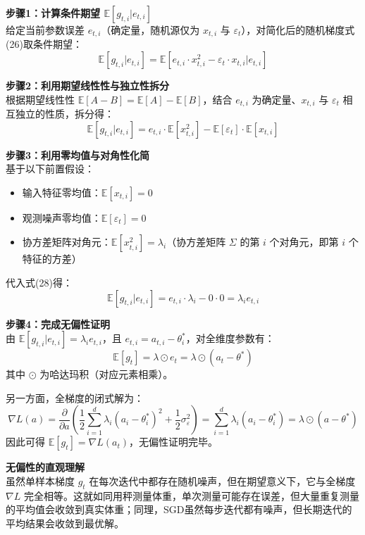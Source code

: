 \documentclass[10pt]{article}
\numberwithin{equation}{section}
\theoremstyle{plain}
\theoremstyle{definition}
\theoremstyle{remark}
\begin{document}
\begin{AnalysisBox}[完整证明过程]
\textbf{步骤1：计算条件期望 $\mathbb{E}[g_{t,i}|e_{t,i}]$}\\
给定当前参数误差 $e_{t,i}$（确定量，随机源仅为 $x_{t,i}$ 与 $\varepsilon_t$），对简化后的随机梯度式(26)取条件期望：
\[ \displaystyle \mathbb{E}[g_{t,i}|e_{t,i}] = \mathbb{E}\left[e_{t,i} \cdot x_{t,i}^2 - \varepsilon_t \cdot x_{t,i}\bigg|e_{t,i}\right] \tag{27} \]

\textbf{步骤2：利用期望线性性与独立性拆分}\\
根据期望线性性 $\mathbb{E}[A-B] = \mathbb{E}[A] - \mathbb{E}[B]$，结合 $e_{t,i}$ 为确定量、$x_{t,i}$ 与 $\varepsilon_t$ 相互独立的性质，拆分得：
\[ \displaystyle \mathbb{E}[g_{t,i}|e_{t,i}] = e_{t,i} \cdot \mathbb{E}[x_{t,i}^2] - \mathbb{E}[\varepsilon_t] \cdot \mathbb{E}[x_{t,i}] \tag{28} \]

\textbf{步骤3：利用零均值与对角性化简}\\
基于以下前置假设：
\begin{itemize}[leftmargin=*,nosep]
    \item 输入特征零均值：$\mathbb{E}[x_{t,i}] = 0$
    \item 观测噪声零均值：$\mathbb{E}[\varepsilon_t] = 0$
    \item 协方差矩阵对角元：$\mathbb{E}[x_{t,i}^2] = \lambda_i$（协方差矩阵 $\Sigma$ 的第 $i$ 个对角元，即第 $i$ 个特征的方差）
\end{itemize}
代入式(28)得：
\[ \displaystyle \mathbb{E}[g_{t,i}|e_{t,i}] = e_{t,i} \cdot \lambda_i - 0 \cdot 0 = \lambda_i e_{t,i} \tag{29} \]

\textbf{步骤4：完成无偏性证明}\\
由 $\mathbb{E}[g_{t,i}|e_{t,i}] = \lambda_i e_{t,i}$，且 $e_{t,i} = a_{t,i} - \theta^*_i$，对全维度参数有：
\[ \displaystyle \mathbb{E}[g_t] = \lambda \odot e_t = \lambda \odot (a_t - \theta^*) \tag{30} \]
其中 $\odot$ 为哈达玛积（对应元素相乘）。

另一方面，全梯度的闭式解为：
\[ \displaystyle \nabla L(a) = \frac{\partial}{\partial a}\left( \frac{1}{2}\sum_{i=1}^d \lambda_i (a_i - \theta^*_i)^2 + \frac{1}{2}\sigma_\varepsilon^2 \right) = \sum_{i=1}^d \lambda_i (a_i - \theta^*_i) = \lambda \odot (a - \theta^*) \]
因此可得 $\mathbb{E}[g_t] = \nabla L(a_t)$，无偏性证明完毕。
\end{AnalysisBox}

\textbf{无偏性的直观理解}\\
虽然单样本梯度 $g_t$ 在每次迭代中都存在随机噪声，但在期望意义下，它与全梯度 $\nabla L$ 完全相等。这就如同用秤测量体重，单次测量可能存在误差，但大量重复测量的平均值会收敛到真实体重；同理，SGD虽然每步迭代都有噪声，但长期迭代的平均结果会收敛到最优解。
\end{document}
